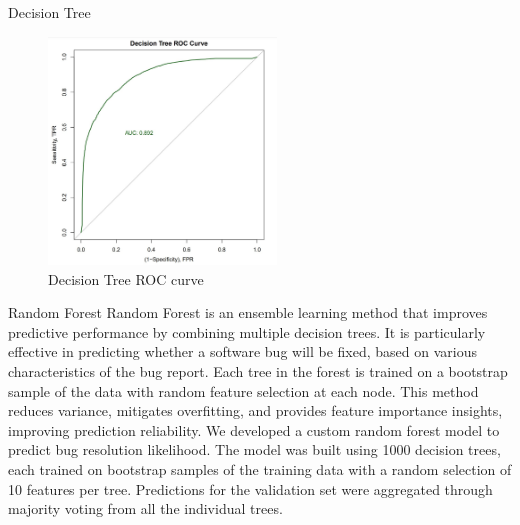 \documentclass[10pt]{beamer}
\begin{document}
\begin{frame}[t]{Decision Tree}\justifying \vspace{1pt}
	\begin{figure}[htp]
		\centering
		\includegraphics[width=0.54\textwidth]{./Decision_tree_ROC.jpg}
		\caption{Decision Tree ROC curve}
		\label{fig:picture1}
	\end{figure}
\end{frame}


\begin{frame}[t]{Random Forest}\justifying \vspace{10pt}
	Random Forest is an ensemble learning method that improves predictive performance by combining multiple decision trees. It is particularly effective in predicting whether a software bug will be fixed, based on various characteristics of the bug report. Each tree in the forest is trained on a bootstrap sample of the data with random feature selection at each node. This method reduces variance, mitigates overfitting, and provides feature importance insights, improving prediction reliability.
	\vskip 8pt
	We developed a custom random forest model to predict bug resolution likelihood. The model was built using 1000 decision trees, each trained on bootstrap samples of the training data with a random selection of 10 features per tree. Predictions for the validation set were aggregated through majority voting from all the individual trees.
\end{frame}
\end{document}
